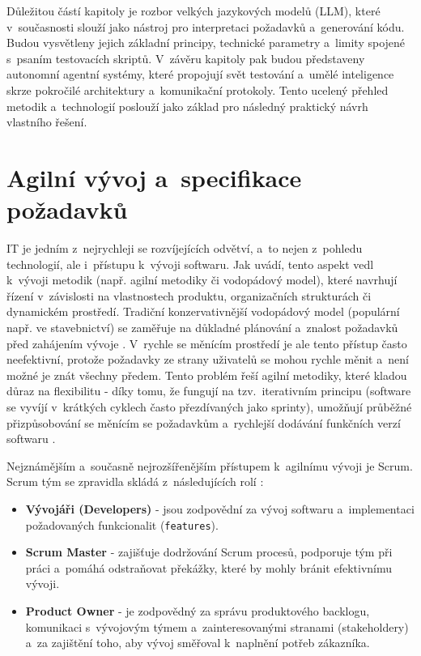 \documentclass[czech, ing, kiv, he, iso690numb, viewonly]{fasthesis}
\begin{document}
Důležitou částí kapitoly je rozbor velkých jazykových modelů (LLM), které v~současnosti slouží jako nástroj pro interpretaci požadavků a~generování kódu. 
Budou vysvětleny jejich základní principy, technické parametry a~limity spojené s~psaním testovacích skriptů. V~závěru kapitoly pak budou představeny autonomní agentní systémy, 
které propojují svět testování a~umělé inteligence skrze pokročilé architektury a~komunikační protokoly. Tento ucelený přehled metodik a~technologií poslouží jako základ pro následný praktický 
návrh vlastního řešení.
\section{Agilní vývoj a~specifikace požadavků}

IT je jedním z~nejrychleji se rozvíjejících odvětví, a~to nejen z~pohledu technologií,
ale i~přístupu k~vývoji softwaru. Jak \cite{articleFromWaterfallToAgile} uvádí, tento aspekt vedl k~vývoji metodik (např. 
agilní metodiky či vodopádový model), které navrhují řízení v~závislosti na vlastnostech produktu, organizačních strukturách či dynamickém prostředí.
Tradiční konzervativnější vodopádový model (populární např. ve stavebnictví) se zaměřuje na důkladné plánování \cite{senarath2021waterfall} a~znalost 
požadavků před zahájením vývoje \cite{almeida2017challenges}. V~rychle se měnícím prostředí je ale tento přístup často neefektivní,
protože požadavky ze strany uživatelů se mohou rychle měnit a~není možné je znát všechny předem. Tento problém řeší agilní metodiky,
které kladou důraz na flexibilitu - díky tomu, že fungují na tzv.~iterativním principu (software se vyvíjí v~krátkých cyklech často
přezdívaných jako sprinty), umožňují průběžné přizpůsobování se měnícím se požadavkům a~rychlejší dodávání funkčních verzí softwaru \cite{almeida2017challenges}. 

Nejznámějším a~současně nejrozšířenějším přístupem k~agilnímu vývoji je Scrum. Scrum tým se zpravidla skládá z~následujících rolí 
\cite{senarath2021waterfall, sassa2023scrum, hron2018scrum, sachdeva2016scrum}:

\begin{itemize}
    \item \textbf{Vývojáři (Developers)} - jsou zodpovědní za vývoj softwaru a~implementaci požadovaných funkcionalit (\texttt{features}).
    
    \item \textbf{Scrum Master} - zajišťuje dodržování Scrum procesů, podporuje tým při práci a~pomáhá odstraňovat překážky, které by mohly bránit efektivnímu vývoji.
    
\item \textbf{Product Owner} - je zodpovědný za správu produktového backlogu, komunikaci s~vývojovým týmem a~zainteresovanými stranami (stakeholdery) 
a~za zajištění toho, aby vývoj směřoval k~naplnění potřeb zákazníka.
\end{itemize}
\end{document}
